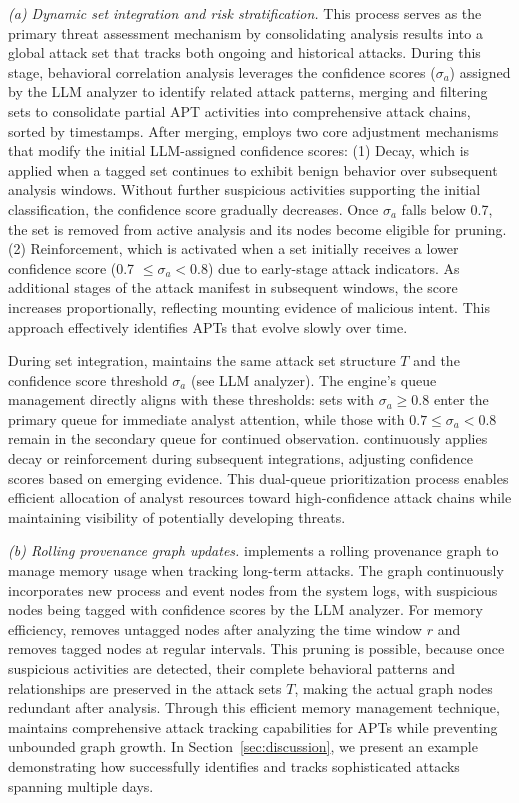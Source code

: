 \noindent\textit{(a) Dynamic set integration and risk stratification.} This process serves as the primary threat assessment mechanism by consolidating analysis results into a global attack set that tracks both ongoing and historical attacks. During this stage, behavioral correlation analysis leverages the confidence scores ($\sigma_a$) assigned by the LLM analyzer to identify related attack patterns, merging and filtering sets to consolidate partial APT activities into comprehensive attack chains, sorted by timestamps.
After merging, \method employs two core adjustment mechanisms that modify the initial LLM-assigned confidence scores: (1) Decay, which is applied when a tagged set continues to exhibit benign behavior over subsequent analysis windows. 
Without further suspicious activities supporting the initial classification, the confidence score gradually decreases. 
Once $\sigma_a$ falls below 0.7, the set is removed from active analysis and its nodes become eligible for pruning. (2) Reinforcement, which is activated when a set initially receives a lower confidence score (0.7 $\leq \sigma_a < 0.8$) due to early-stage attack indicators. As additional stages of the attack manifest in subsequent windows, the score increases proportionally, reflecting mounting evidence of malicious intent. This approach effectively identifies APTs that evolve slowly over time.

\noindent During set integration, \method maintains the same attack set structure $T$ and the confidence score threshold $\sigma_a$ (see LLM analyzer). 
The engine's queue management directly aligns with these thresholds: sets with $\sigma_a \geq 0.8$ enter the primary queue for immediate analyst attention, while those with $0.7 \leq \sigma_a < 0.8$ remain in the secondary queue for continued observation. 
\method continuously applies decay or reinforcement during subsequent integrations, adjusting confidence scores based on emerging evidence. 
This dual-queue prioritization process enables efficient allocation of analyst resources toward high-confidence attack chains while maintaining visibility of potentially developing threats.

\noindent\textit{(b) Rolling provenance graph updates.} \method implements a rolling provenance graph to manage memory usage when tracking long-term attacks. 
The graph continuously incorporates new process and event nodes from the system logs, with suspicious nodes being tagged with confidence scores by the LLM analyzer. 
For memory efficiency, \method removes untagged nodes after analyzing the time window $r$ and removes tagged nodes at regular intervals. %
This pruning is possible, because once suspicious activities are detected, their complete behavioral patterns and relationships are preserved in the attack sets $T$, making the actual graph nodes redundant after analysis. Through this efficient memory management technique, \method maintains comprehensive attack tracking capabilities for APTs while preventing unbounded graph growth. In Section~\ref{sec:discussion}, we present an example demonstrating how \method successfully identifies and tracks sophisticated attacks spanning multiple days.